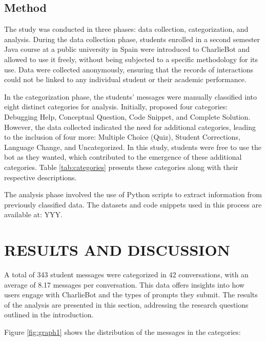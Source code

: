 \documentclass[a4paper,twoside]{article}
\begin{document}
\subsection{Method}

The study was conducted in three phases: data collection,
categorization, and analysis. During the data collection phase, students
enrolled in a second semester Java course at a public university in Spain were
introduced to CharlieBot and allowed to use it freely, without being subjected
to a specific methodology for its use. Data were collected anonymously, ensuring
that the records of interactions could not be linked to any individual student
or their academic performance.

In the categorization phase, the students' messages were manually classified
into eight distinct categories for analysis. Initially, \cite{Ghimire24}
proposed four categories: Debugging Help, Conceptual Question, Code Snippet,
and Complete Solution. However, the data collected indicated the need for
additional categories, leading to the inclusion of four more: Multiple Choice
(Quiz), Student Corrections, Language Change, and Uncategorized. In this study,
students were free to use the bot as they wanted, which contributed to the
emergence of these additional categories. Table \ref{tab:categories} presents
these categories along with their respective descriptions.

The analysis phase involved the use of Python scripts to extract information
from previously classified data. The datasets and code snippets used in this
process are available at: YYY.

\section{\uppercase{Results and Discussion}}

A total of 343 student messages were categorized in 42 conversations, with
an average of 8.17 messages per conversation. This data offers insights into how
users engage with CharlieBot and the types of prompts they submit. The results of
the analysis are presented in this section, addressing the research questions
outlined in the introduction.

Figure \ref{fig:graph1} shows the distribution of the messages in the
categories:
\end{document}
